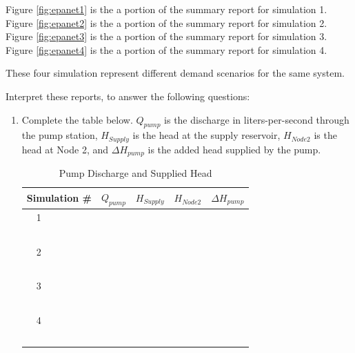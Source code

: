 \documentclass[11pt]{article}
\begin{document}
\begin{enumerate}
Figure \ref{fig:epanet1} is the a portion of the summary report for simulation 1.   
Figure \ref{fig:epanet2} is the a portion of the summary report for simulation 2.  
Figure \ref{fig:epanet3} is the a portion of the summary report for simulation 3.  
Figure \ref{fig:epanet4} is the a portion of the summary report for simulation 4.

These four simulation represent different demand scenarios for the same system.



Interpret these reports, to answer the following questions:

\begin{enumerate}
\item Complete the table below.  $Q_{pump}$ is the discharge in liters-per-second through the pump station, $H_{Supply}$ is the head at the supply reservoir,  $H_{Node2}$ is the head at Node 2, and $\Delta H_{pump}$ is the added head supplied by the pump.
\begin{table}[htbp]
   \centering
      \caption{Pump Discharge and Supplied Head}
   \begin{tabular}{p{1in} p{1in} p{1in} p{1in} p{1in} } %
Simulation \# & $Q_{pump}$ & $H_{Supply}$ & $H_{Node2}$ & $\Delta H_{pump}$ \\
\hline
\hline
~~1 & ~ &~ & ~ & ~ \\
~ & ~ &~ & ~ & ~ \\
\hline
~~2 & ~ &~ & ~ & ~ \\
~ & ~ &~ & ~ & ~ \\
\hline
~~3 & ~ &~ & ~ & ~\\
~ & ~ &~ & ~ & ~ \\
\hline
~~4 & ~ &~ & ~ & ~ \\
~ & ~ &~ & ~ & ~ \\
\hline
   \end{tabular}
   \label{tab:pump-curve}
\end{table}


\end{enumerate}
\end{enumerate}
\end{document}
